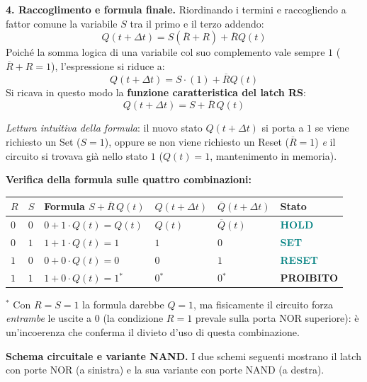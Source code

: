 \documentclass[11pt,a4paper]{report}
\begin{document}
\medskip
\noindent\textbf{4. Raccoglimento e formula finale.}
Riordinando i termini e raccogliendo a fattor comune la variabile $S$ tra il primo e il terzo addendo:
\[
Q(t+\Delta t) = S(\overline{R} + R) + \overline{R}Q(t)
\]
Poiché la somma logica di una variabile col suo complemento vale sempre $1$ ($\overline{R} + R = 1$), l'espressione si riduce a:
\[
Q(t+\Delta t) = S \cdot (1) + \overline{R}Q(t)
\]
Si ricava in questo modo la \textbf{funzione caratteristica del latch RS}:
\[
\boxed{Q(t+\Delta t) = S + \overline{R}\,Q(t)}
\]

\noindent\textit{Lettura intuitiva della formula}: il nuovo stato $Q(t+\Delta t)$ si porta a $1$ se viene richiesto un Set ($S=1$), oppure se non viene richiesto un Reset ($\overline{R}=1$) \emph{e} il circuito si trovava già nello stato $1$ ($Q(t)=1$, mantenimento in memoria).

\medskip
\noindent\textbf{Verifica della formula sulle quattro combinazioni:}

\begin{center}
\renewcommand{\arraystretch}{1.35}
\begin{tabular}{>{\centering}m{0.8cm}>{\centering}m{0.8cm}|>{\centering}m{2.2cm}|>{\centering}m{1.5cm}>{\centering}m{1.8cm}|l}
\toprule
$R$ & $S$ & Formula $S+\overline{R}\,Q(t)$ & $Q(t{+}\Delta t)$ & $\overline{Q}(t{+}\Delta t)$ & \textbf{Stato}\\
\midrule
$0$ & $0$ & $0 + 1\cdot Q(t) = Q(t)$         & $Q(t)$  & $\overline{Q}(t)$ & \textcolor{teal}{\textbf{HOLD}}\\
$0$ & $1$ & $1 + 1\cdot Q(t) = 1$             & $1$     & $0$               & \textcolor{teal}{\textbf{SET}}\\
$1$ & $0$ & $0 + 0\cdot Q(t) = 0$             & $0$     & $1$               & \textcolor{teal}{\textbf{RESET}}\\
\rowcolor{red!8}$1$ & $1$ & $1 + 0\cdot Q(t) = 1$\;$^*$    & $0$\;$^*$ & $0$\;$^*$     & \textcolor{red!70!black}{\textbf{PROIBITO}}\\
\bottomrule
\end{tabular}
\end{center}

{\small $^*$ Con $R=S=1$ la formula darebbe $Q=1$, ma fisicamente il circuito forza
\emph{entrambe} le uscite a $0$ (la condizione $R=1$ prevale sulla porta NOR superiore):
è un'incoerenza che conferma il divieto d'uso di questa combinazione.}

\bigskip
\noindent\textbf{Schema circuitale e variante NAND.}
I due schemi seguenti mostrano il latch con porte NOR (a sinistra) e la sua
variante con porte NAND (a destra).
\end{document}
